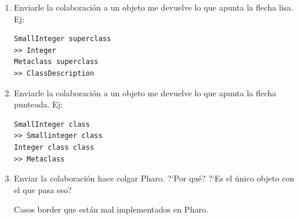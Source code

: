 \begin{enumerate}
 \item Enviarle la colaboraci\'on  a un objeto me devuelve lo que apunta la flecha lisa. Ej: 
\begin{verbatim}
SmallInteger superclass
>> Integer
Metaclass superclass
>> ClassDescription
\end{verbatim}

 \item Enviarle la colaboraci\'on  a un objeto me devuelve lo que apunta la flecha punteada. Ej: 
\begin{verbatim}
SmallInteger class
>> Smallinteger class
Integer class class
>> Metaclass
\end{verbatim}
  
 \item Enviar la colaboraci\'on  hace colgar Pharo. ?`Por qu\'e? ?`Es el \'unico objeto con el que pasa eso? 

 Casos border que est\'an mal implementados en Pharo. 
\end{enumerate}